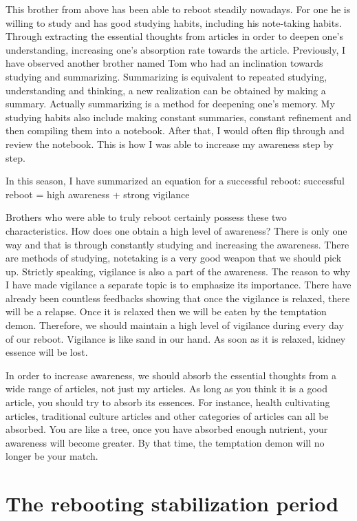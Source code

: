 \documentclass[
]{book}
\begin{document}
This brother from above has been able to reboot steadily nowadays. For one he is willing to study and has good studying habits, including his note-taking habits. Through extracting the essential thoughts from articles in order to deepen one's understanding, increasing one's absorption rate towards the article. Previously, I have observed another brother named Tom who had an inclination towards studying and summarizing. Summarizing is equivalent to repeated studying, understanding and thinking, a new realization can be obtained by making a summary. Actually summarizing is a method for deepening one's memory. My studying habits also include making constant summaries, constant refinement and then compiling them into a notebook. After that, I would often flip through and review the notebook. This is how I was able to increase my awareness step by step.

In this season, I have summarized an equation for a successful reboot:
successful reboot = high awareness + strong vigilance

Brothers who were able to truly reboot certainly possess these two characteristics. How does one obtain a high level of awareness? There is only one way and that is through constantly studying and increasing the awareness. There are methods of studying, notetaking is a very good weapon that we should pick up. Strictly speaking, vigilance is also a part of the awareness. The reason to why I have made vigilance a separate topic is to emphasize its importance. There have already been countless feedbacks showing that once the vigilance is relaxed, there will be a relapse. Once it is relaxed then we will be eaten by the temptation demon. Therefore, we should maintain a high level of vigilance during every day of our reboot. Vigilance is like sand in our hand. As soon as it is relaxed, kidney essence will be lost.

In order to increase awareness, we should absorb the essential thoughts from a wide range of articles, not just my articles. As long as you think it is a good article, you should try to absorb its essences. For instance, health cultivating articles, traditional culture articles and other categories of articles can all be absorbed. You are like a tree, once you have absorbed enough nutrient, your awareness will become greater. By that time, the temptation demon will no longer be your match.

\hypertarget{the-rebooting-stabilization-period}{%
\section{The rebooting stabilization period}\label{the-rebooting-stabilization-period}}
\end{document}
